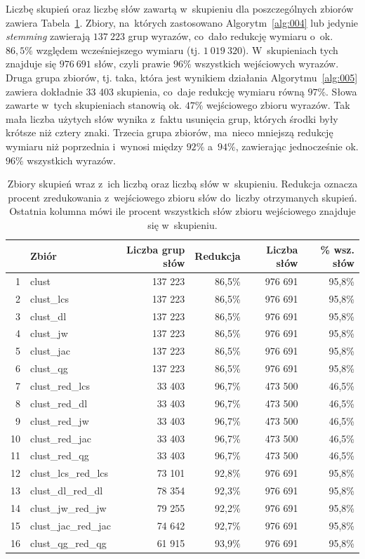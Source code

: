\documentclass{praca1}
\begin{document}
Liczbę skupień oraz liczbę słów zawartą w~skupieniu dla poszczególnych zbiorów zawiera Tabela~\ref{tab:005}. Zbiory, na~których zastosowano Algorytm~\ref{alg:004} lub jedynie \emph{stemming} zawierają $137\ 223$ grup wyrazów, co~dało redukcję wymiaru o~ok. $86{,}5\%$ względem wcześniejszego wymiaru (tj. $1\ 019\ 320$). W~skupieniach tych znajduje się $976\ 691$ słów, czyli prawie $96\%$  wszystkich wejściowych wyrazów. Druga grupa zbiorów, tj. taka, która jest wynikiem działania Algorytmu~\ref{alg:005} zawiera dokładnie 33 403 skupienia, co~daje redukcję wymiaru równą $97\%$. Słowa zawarte w~tych skupieniach stanowią ok. $47\%$ wejściowego zbioru wyrazów. Tak mała liczba użytych słów wynika z~faktu usunięcia grup, których środki były krótsze niż cztery znaki. Trzecia grupa zbiorów, ma~nieco mniejszą redukcję wymiaru niż poprzednia i~wynosi między $92\%$ a~$94\%$, zawierając jednocześnie ok. $96\%$ wszystkich wyrazów.

\begin{table}[!h]
\centering
\caption{Zbiory skupień wraz z~ich liczbą oraz liczbą słów w~skupieniu. Redukcja oznacza procent zredukowania z~wejściowego zbioru słów do~liczby otrzymanych skupień. Ostatnia kolumna mówi ile procent wszystkich słów zbioru wejściowego znajduje się w~skupieniu.} \smallskip
\begin{tabular}{|rl|rr|rr|}
  \hline
 & Zbiór & Liczba grup słów & Redukcja & Liczba słów & \% wsz. słów \\ 
  \hline
1 & clust & 137 223 & 86,5\% & 976 691 & 95,8\% \\ 
  2 & clust\_lcs & 137 223 & 86,5\% & 976 691 & 95,8\% \\ 
  3 & clust\_dl & 137 223 & 86,5\% & 976 691 & 95,8\% \\ 
  4 & clust\_jw & 137 223 & 86,5\% & 976 691 & 95,8\% \\ 
  5 & clust\_jac & 137 223 & 86,5\% & 976 691 & 95,8\% \\ 
  6 & clust\_qg & 137 223 & 86,5\% & 976 691 & 95,8\% \\ 
   \hline
7 & clust\_red\_lcs & 33 403 & 96,7\% & 473 500 & 46,5\% \\ 
  8 & clust\_red\_dl & 33 403 & 96,7\% & 473 500 & 46,5\% \\ 
  9 & clust\_red\_jw & 33 403 & 96,7\% & 473 500 & 46,5\% \\ 
  10 & clust\_red\_jac & 33 403 & 96,7\% & 473 500 & 46,5\% \\ 
  11 & clust\_red\_qg & 33 403 & 96,7\% & 473 500 & 46,5\% \\ 
   \hline
12 & clust\_lcs\_red\_lcs & 73 101 & 92,8\% & 976 691 & 95,8\% \\ 
  13 & clust\_dl\_red\_dl & 78 354 & 92,3\% & 976 691 & 95,8\% \\ 
  14 & clust\_jw\_red\_jw & 79 255 & 92,2\% & 976 691 & 95,8\% \\ 
  15 & clust\_jac\_red\_jac & 74 642 & 92,7\% & 976 691 & 95,8\% \\ 
  16 & clust\_qg\_red\_qg & 61 915 & 93,9\% & 976 691 & 95,8\% \\ 
   \hline
\end{tabular}
\label{tab:005}
\end{table}
\end{document}
